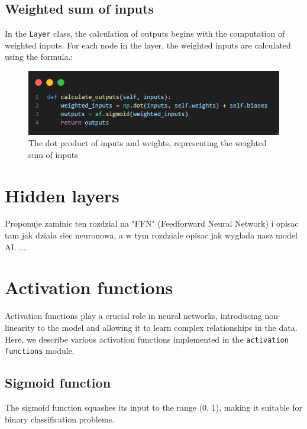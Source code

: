 \documentclass{article}
\begin{document}
\subsection{Weighted sum of inputs}
In the \texttt{Layer} class, the calculation of outputs begins with the computation of weighted inputs. For each node in the layer, the weighted inputs are calculated using the formula.:
\begin{figure}[ht]
    \centering
    \includegraphics[width=1\textwidth]{images/dot-product-of-inputs-and-weights.png}
    \caption{The dot product of inputs and weights, representing the weighted sum of inputs}
    \label{fig:weighted_sum}
\end{figure}

\newpage
\section{Hidden layers}
Proponuje zaminic ten rozdzial na "FFN" (Feedforward Neural Network) i opisac tam jak dziala siec neuronowa, a w tym rozdziale opisac jak wyglada nasz model AI.
...

\newpage
\section{Activation functions}
Activation functions play a crucial role in neural networks, introducing non-linearity to the model and allowing it to learn complex relationships in the data. Here, we describe various activation functions implemented in the \texttt{activation functions} module.

\subsection{Sigmoid function}
The sigmoid function squashes its input to the range (0, 1), making it suitable for binary classification problems.
\end{document}

